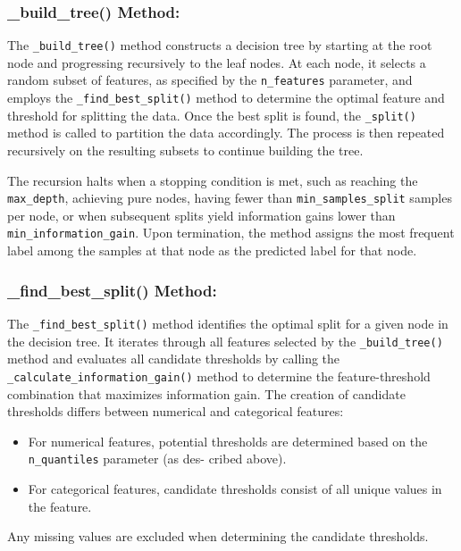 \documentclass{article}
\begin{document}
\subsubsection*{\_build\_tree() Method:}

The \texttt{\_build\_tree()} method constructs a decision tree by starting at the root node and progressing recursively to the leaf nodes. At each node, it selects a random subset of features, as specified by the \texttt{n\_features} parameter, and employs the \texttt{\_find\_best\_split()} method to determine the optimal feature and threshold for splitting the data. Once the best split is found, the \texttt{\_split()} method is called to partition the data accordingly. The process is then repeated recursively on the resulting subsets to continue building the tree.

The recursion halts when a stopping condition is met, such as reaching the \texttt{max\_depth}, achieving pure nodes, having fewer than \texttt{min\_samples\_split} samples per node, or when subsequent splits yield information gains lower than \texttt{min\_information\_gain}. Upon termination, the method assigns the most frequent label among the samples at that node as the predicted label for that node.

\subsubsection*{\_find\_best\_split() Method:}

The \texttt{\_find\_best\_split()} method identifies the optimal split for a given node in the decision tree. It iterates through all features selected by the \texttt{\_build\_tree()} method and evaluates all candidate thresholds by calling the \texttt{\_calculate\_information\_gain()} method to determine the feature-threshold combination that maximizes information gain. The creation of candidate thresholds differs between numerical and categorical features:

\begin{itemize}
\item For numerical features, potential thresholds are determined based on the \texttt{n\_quantiles} parameter (as des- cribed above).
\item For categorical features, candidate thresholds consist of all unique values in the feature.
\end{itemize}

Any missing values are excluded when determining the candidate thresholds.
\end{document}
